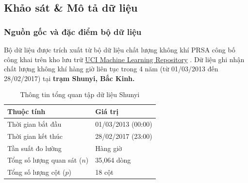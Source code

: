 \documentclass[12pt,a4paper]{article}
\begin{document}
\subsection{Khảo sát \& Mô tả dữ liệu}

\subsubsection{Nguồn gốc và đặc điểm bộ dữ liệu}
Bộ dữ liệu được trích xuất từ bộ dữ liệu chất lượng không khí PRSA công bố công khai trên kho lưu trữ \href{https://archive.ics.uci.edu/dataset/501/beijing+multi+site+air+quality+data}{UCI Machine Learning Repository} \cite{ucidata}. Dữ liệu ghi nhận chất lượng không khí hàng giờ liên tục trong 4 năm (từ 01/03/2013 đến 28/02/2017) tại \textbf{trạm Shunyi, Bắc Kinh.}

\begin{table}[H]
\centering
\caption{Thông tin tổng quan tập dữ liệu Shunyi}
\begin{tabular}{ll}
\toprule
\textbf{Thuộc tính} & \textbf{Giá trị} \\
\midrule
Thời gian bắt đầu & 01/03/2013 (00:00) \\
Thời gian kết thúc & 28/02/2017 (23:00) \\
Tần suất đo lường & Hàng giờ \\
Tổng số lượng quan sát ($n$) & 35,064 dòng \\
Tổng số lượng cột ($p$) & 18 cột \\
\bottomrule
\end{tabular}
\end{table}
\end{document}
